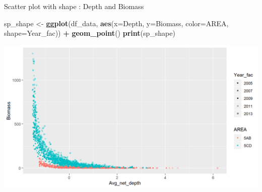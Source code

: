 \documentclass[
  ignorenonframetext,
]{beamer}
\newenvironment{Shaded}{\begin{snugshade}}{\end{snugshade}}
\newcommand{\DataTypeTok}[1]{\textcolor[rgb]{0.13,0.29,0.53}{#1}}
\newcommand{\KeywordTok}[1]{\textcolor[rgb]{0.13,0.29,0.53}{\textbf{#1}}}
\newcommand{\NormalTok}[1]{#1}
\newcommand{\OperatorTok}[1]{\textcolor[rgb]{0.81,0.36,0.00}{\textbf{#1}}}
\newcommand{\StringTok}[1]{\textcolor[rgb]{0.31,0.60,0.02}{#1}}
\begin{document}
\begin{frame}[fragile]{Scatter plot with shape : Depth and Biomass}
\protect\hypertarget{scatter-plot-with-shape-depth-and-biomass}{}

\begin{Shaded}
\begin{Highlighting}[]
\NormalTok{sp_shape <-}\StringTok{ }\KeywordTok{ggplot}\NormalTok{(df_data, }\KeywordTok{aes}\NormalTok{(}\DataTypeTok{x=}\NormalTok{Depth, }\DataTypeTok{y=}\NormalTok{Biomass, }\DataTypeTok{color=}\NormalTok{AREA, }\DataTypeTok{shape=}\NormalTok{Year_fac)) }\OperatorTok{+}
\StringTok{  }\KeywordTok{geom_point}\NormalTok{()}
\KeywordTok{print}\NormalTok{(sp_shape)}
\end{Highlighting}
\end{Shaded}

\begin{center}\includegraphics[width=0.8\linewidth]{figure/sp_shape-1} \end{center}

\end{frame}
\end{document}
